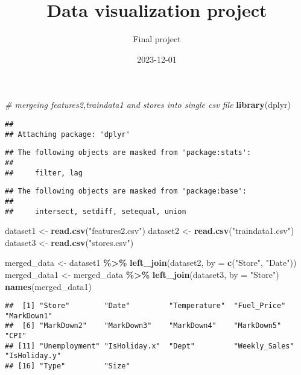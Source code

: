 \documentclass[
]{article}
\title{Data visualization project}
\author{Final project}
\date{2023-12-01}
\newenvironment{Shaded}{\begin{snugshade}}{\end{snugshade}}
\newcommand{\AttributeTok}[1]{\textcolor[rgb]{0.13,0.29,0.53}{#1}}
\newcommand{\CommentTok}[1]{\textcolor[rgb]{0.56,0.35,0.01}{\textit{#1}}}
\newcommand{\FunctionTok}[1]{\textcolor[rgb]{0.13,0.29,0.53}{\textbf{#1}}}
\newcommand{\NormalTok}[1]{#1}
\newcommand{\OtherTok}[1]{\textcolor[rgb]{0.56,0.35,0.01}{#1}}
\newcommand{\SpecialCharTok}[1]{\textcolor[rgb]{0.81,0.36,0.00}{\textbf{#1}}}
\newcommand{\StringTok}[1]{\textcolor[rgb]{0.31,0.60,0.02}{#1}}
\begin{document}
\maketitle

\begin{Shaded}
\begin{Highlighting}[]
\CommentTok{\# mergeing features2,traindata1 and stores into single csv file}
\FunctionTok{library}\NormalTok{(dplyr)}
\end{Highlighting}
\end{Shaded}

\begin{verbatim}
## 
## Attaching package: 'dplyr'
\end{verbatim}

\begin{verbatim}
## The following objects are masked from 'package:stats':
## 
##     filter, lag
\end{verbatim}

\begin{verbatim}
## The following objects are masked from 'package:base':
## 
##     intersect, setdiff, setequal, union
\end{verbatim}

\begin{Shaded}
\begin{Highlighting}[]
\NormalTok{dataset1 }\OtherTok{\textless{}{-}} \FunctionTok{read.csv}\NormalTok{(}\StringTok{"features2.csv"}\NormalTok{)}
\NormalTok{dataset2 }\OtherTok{\textless{}{-}} \FunctionTok{read.csv}\NormalTok{(}\StringTok{"traindata1.csv"}\NormalTok{)}
\NormalTok{dataset3 }\OtherTok{\textless{}{-}} \FunctionTok{read.csv}\NormalTok{(}\StringTok{"stores.csv"}\NormalTok{)}

\NormalTok{merged\_data }\OtherTok{\textless{}{-}}\NormalTok{ dataset1 }\SpecialCharTok{\%\textgreater{}\%}
  \FunctionTok{left\_join}\NormalTok{(dataset2, }\AttributeTok{by =} \FunctionTok{c}\NormalTok{(}\StringTok{"Store"}\NormalTok{, }\StringTok{"Date"}\NormalTok{))}
\NormalTok{merged\_data1 }\OtherTok{\textless{}{-}}\NormalTok{ merged\_data }\SpecialCharTok{\%\textgreater{}\%}
  \FunctionTok{left\_join}\NormalTok{(dataset3, }\AttributeTok{by =} \StringTok{"Store"}\NormalTok{)}
\FunctionTok{names}\NormalTok{(merged\_data1)}
\end{Highlighting}
\end{Shaded}

\begin{verbatim}
##  [1] "Store"        "Date"         "Temperature"  "Fuel_Price"   "MarkDown1"   
##  [6] "MarkDown2"    "MarkDown3"    "MarkDown4"    "MarkDown5"    "CPI"         
## [11] "Unemployment" "IsHoliday.x"  "Dept"         "Weekly_Sales" "IsHoliday.y" 
## [16] "Type"         "Size"
\end{verbatim}
\end{document}
